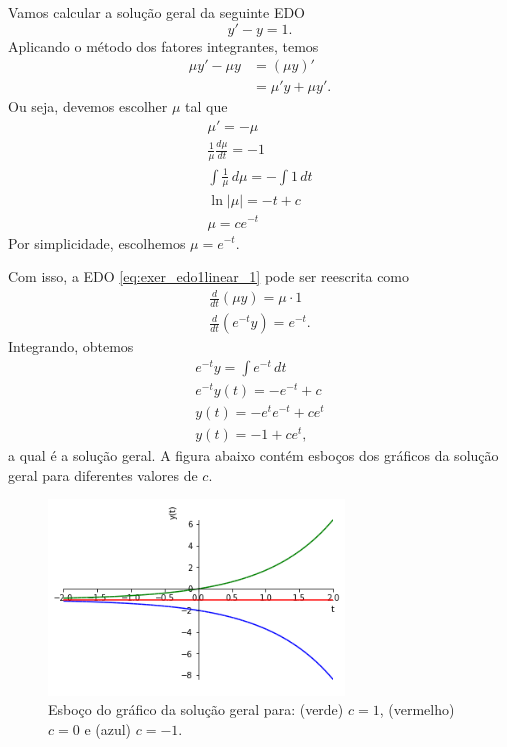 \begin{ex}
  Vamos calcular a solução geral da seguinte EDO
  \begin{equation}\label{eq:exer_edo1linear_1}
    y' - y = 1. 
  \end{equation}
  Aplicando o método dos fatores integrantes, temos
  \begin{align}
    \mu y' - \mu y &= (\mu y)' \\
                   &= \mu' y + \mu y'.
  \end{align}
  Ou seja, devemos escolher $\mu$ tal que
  \begin{gather}
    \mu' = -\mu \\
    \frac{1}{\mu}\frac{d\mu}{dt} = -1 \\
    \int \frac{1}{\mu}\,d\mu = -\int 1\,dt \\
    \ln|\mu| = -t + c \\
    \mu = ce^{-t}
  \end{gather}
  Por simplicidade, escolhemos $\mu = e^{-t}$.

  Com isso, a EDO \eqref{eq:exer_edo1linear_1} pode ser reescrita como
  \begin{gather}
    \frac{d}{dt}\left(\mu y\right) = \mu\cdot 1 \\
    \frac{d}{dt}\left(e^{-t}y\right) = e^{-t}.
  \end{gather}
  Integrando, obtemos
  \begin{gather}
    e^{-t}y = \int e^{-t}\,dt \\
    e^{-t}y(t) = -e^{-t} + c \\
    y(t) = -e^te^{-t} + ce^{t} \\
    y(t) =  -1 + ce^{t},
  \end{gather}
  a qual é a solução geral. A figura abaixo contém esboços dos gráficos da solução geral para diferentes valores de $c$.

  \begin{figure}[H]
    \centering
    \includegraphics[width=0.7\textwidth]{cap_edo1ordem/dados/fig_ex_edo1o_fi/fig_ex_edo1o_fi}
    \caption[Esboço do gráfico da solução geral para diferentes valores de $c$.]{Esboço do gráfico da solução geral para: (verde) $c=1$, (vermelho) $c=0$ e (azul) $c=-1$.}
    \label{fig:ex_edo1o_fi}
  \end{figure}


\end{ex}
